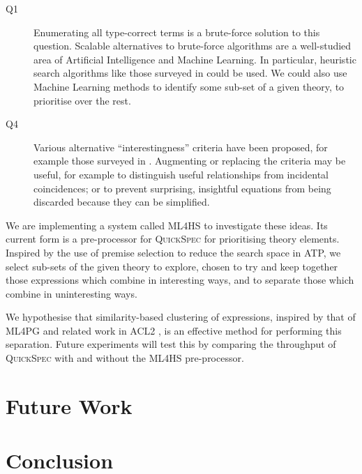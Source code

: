 \documentclass[]{article}
\begin{document}
\begin{description}
\item [Q1]
  Enumerating all type-correct terms is a brute-force solution to this question.
  Scalable alternatives to brute-force algorithms are a well-studied area of
  Artificial Intelligence and Machine Learning. In particular, heuristic
  search algorithms like those surveyed in \cite{blum2011hybrid} could be used.
  We could also use Machine Learning methods to identify some sub-set of a given
  theory, to prioritise over the rest.
\item [Q4]
  Various alternative ``interestingness'' criteria have been proposed, for
  example those surveyed in \cite{geng2006interestingness}. Augmenting or
  replacing the criteria may be useful, for example to distinguish useful
  relationships from incidental coincidences; or to prevent surprising,
  insightful equations from being discarded because they can be simplified.
\end{description}

We are implementing a system called \textsc{ML4HS} to investigate these ideas.
Its current form is a pre-processor for \textsc{QuickSpec} for prioritising
theory elements. Inspired by the use of premise selection
\cite{kuhlwein2012overview} to reduce the search space in ATP,
we select sub-sets of the given theory to explore, chosen to try and keep
together those expressions which combine in interesting ways, and to separate
those which combine in uninteresting ways.

We hypothesise that similarity-based clustering of expressions, inspired by that
of \textsc{ML4PG} \cite{journals/corr/abs-1212-3618} and related work in ACL2
\cite{heras2013proof}, is an effective method for performing this separation.
Future experiments will test this by comparing the throughput of
\textsc{QuickSpec} with and without the \textsc{ML4HS} pre-processor.



\section{Future Work}
\label{future}

\iffalse
QuickSpec: extend or extinguish?

Improve and find other use cases/scenarios for clustering and feature extraction

Other directions for Theory Exploration?

How about systems based on term rewriting, logic programming, etc.?
\fi

\section{Conclusion}
\label{conclusion}



\end{document}
